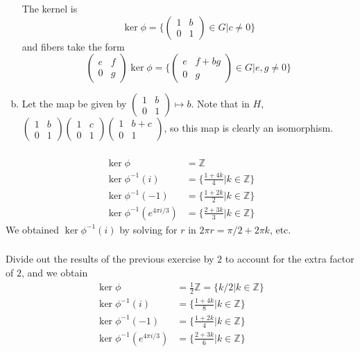 \documentclass{article}
\newcommand{\ints}{\mathbb{Z}}
\newcommand{\set}[1]{ \{ #1 \} }
\newcommand{\phiinv}{\phi^{-1}}
\newcommand{\vbar}{\vert}
\begin{document}
\begin{enumerate}[(a)]
The kernel is
\begin{equation}
\ker\phi = \set{\begin{pmatrix}1 & b\\0 & 1\end{pmatrix} \in G | c \neq 0}
\end{equation}
and fibers take the form
\begin{equation}
\begin{pmatrix}e & f\\0 & g\end{pmatrix}\ker\phi =
\set{\begin{pmatrix}e & f+bg\\0 & g\end{pmatrix} \in G \vert e,g \neq 0}
\end{equation}
\item Let the map be given by $\begin{pmatrix}1 & b\\0 & 1\end{pmatrix} \mapsto b$. Note that in $H$, $\begin{pmatrix}1 & b\\0 & 1\end{pmatrix}\begin{pmatrix}1 & c\\0 & 1\end{pmatrix}\begin{pmatrix}1 & b+c\\0 & 1\end{pmatrix}$, so this map is clearly an isomorphism.
\end{enumerate}
\subsubsection{}\label{ex1p12}
\begin{align*}
\ker\phi &= \ints\\
\ker\phiinv(i) &= \set{\frac{1+4k}{4} \vbar k \in \ints}\\
\ker\phiinv(-1) &= \set{\frac{1+2k}{2} \vbar k \in \ints}\\
\ker\phiinv(e^{4\pi i/3}) &= \set{\frac{2+3k}{3} \vbar k \in \ints}
\end{align*}
We obtained $\ker\phiinv(i)$ by solving for $r$ in $2\pi r = \pi/2 + 2\pi k$, etc.
\subsubsection{}\label{ex1p13}
Divide out the results of the previous exercise by $2$ to account for the extra factor of $2$, and we obtain
\begin{align*}
\ker\phi &= \frac{1}{2}\ints = \set{k/2 \vbar k \in \ints}\\
\ker\phiinv(i) &= \set{\frac{1+4k}{8} \vbar k \in \ints}\\
\ker\phiinv(-1) &= \set{\frac{1+2k}{4} \vbar k \in \ints}\\
\ker\phiinv(e^{4\pi i/3}) &= \set{\frac{2+3k}{6} \vbar k \in \ints}
\end{align*}
\end{document}

